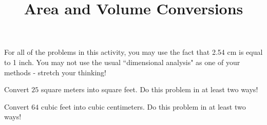 \documentclass[nooutcomes,noauthor]{ximera}
\title{Area and Volume Conversions}
\begin{document}
\begin{abstract}\end{abstract}
\maketitle



For all of the problems in this activity, you may use the fact that 2.54 cm is equal to 1 inch.  You may not use the usual ``dimensional analysis" as one of your methods - stretch your thinking!



\begin{problem}
Convert $25$ square meters into square feet.  Do this problem in at least two ways!

\end{problem} \vfill

\begin{problem}
Convert $64$ cubic feet into cubic centimeters.  Do this problem in at least two ways!

\end{problem} \vfill

\newpage
\end{document}
